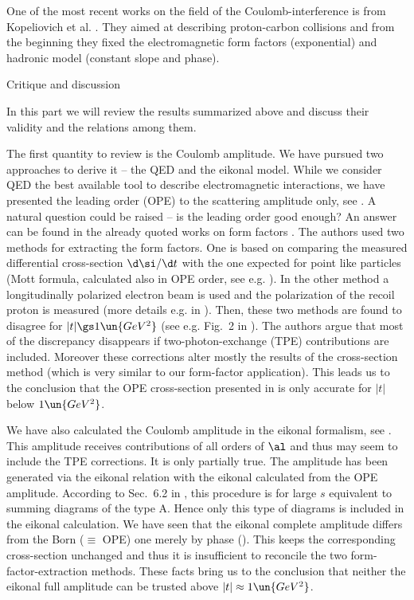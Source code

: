 One of the most recent works on the field of the Coulomb-interference is from Kopeliovich et al. . They aimed at describing proton-carbon collisions and from the beginning they fixed the electromagnetic form factors (exponential) and hadronic model (constant slope and phase).

\caption{Critique and discussion}

In this part we will review the results summarized above and discuss their validity and the relations among them.

The first quantity to review is the Coulomb amplitude. We have pursued two approaches to derive it -- the QED and the eikonal model. While we consider QED the best available tool to describe electromagnetic interactions, we have presented the leading order (OPE) to the scattering amplitude only, see . A natural question could be raised -- is the leading order good enough? An answer can be found in the already quoted works on form factors . The authors used two methods for extracting the form factors. One is based on comparing the measured differential cross-section $\d\si/\d t$ with the one expected for point like particles (Mott formula, calculated also in OPE order, see e.g. ). In the other method a longitudinally polarized electron beam is used and the polarization of the recoil proton is measured (more details e.g. in ). Then, these two methods are found to disagree for $|t| \gs 1\un{GeV^2}$ (see e.g. Fig.~2 in ). The authors argue that most of the discrepancy disappears if two-photon-exchange (TPE) contributions are included. Moreover these corrections alter mostly the results of the cross-section method (which is very similar to our form-factor application). This leads us to the conclusion that the OPE cross-section presented in  is only accurate for $|t|$ below $1\un{GeV^2}$.

We have also calculated the Coulomb amplitude in the eikonal formalism, see . This amplitude receives contributions of all orders of $\al$ and thus may seem to include the TPE corrections. It is only partially true. The amplitude has been generated via the eikonal relation  with the eikonal calculated from the OPE amplitude. According to Sec.~6.2 in , this procedure is for large $s$ equivalent to summing diagrams of the type  A. Hence only this type of diagrams is included in the eikonal calculation. We have seen that the eikonal complete amplitude differs from the Born ($\equiv$ OPE) one merely by phase (). This keeps the corresponding cross-section unchanged and thus it is insufficient to reconcile the two form-factor-extraction methods. These facts bring us to the conclusion that neither the eikonal full amplitude can be trusted above $|t|\approx 1\un{GeV^2}$.

